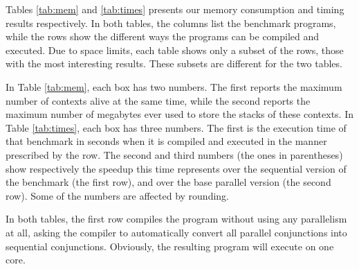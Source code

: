 
Tables \ref{tab:mem} and \ref{tab:times}
presents our memory consumption and timing results respectively.
In both tables,
the columns list the benchmark programs,
while the rows show the different ways
the programs can be compiled and executed.
Due to space limits,
each table shows only a subset of the rows,
those with the most interesting results.
These subsets are different for the two tables.

In Table \ref{tab:mem}, each box has two numbers.
The first reports the maximum number of contexts alive at the same time,
while the second reports the maximum number of megabytes
ever used to store the stacks of these contexts.
In Table \ref{tab:times}, each box has three numbers.
The first is the execution time of that benchmark in seconds
when it is compiled and executed in the manner prescribed by the row.
The second and third numbers (the ones in parentheses)
show respectively the speedup this time represents
over the sequential version of the benchmark (the first row),
and over the base parallel version (the second row).
Some of the numbers are affected by rounding.

In both tables, the first row
compiles the program without using any parallelism at all,
asking the compiler to automatically convert
all parallel conjunctions into sequential conjunctions.
Obviously, the resulting program will execute on one core.

